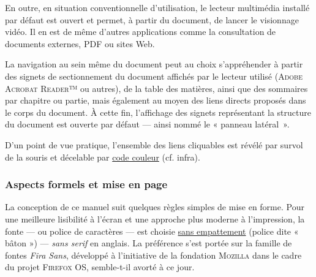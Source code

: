 En outre, en situation conventionnelle d'utilisation, le lecteur multimédia installé par défaut est ouvert et permet, à partir du document, de lancer le visionnage vidéo. Il en est de même d'autres applications comme la consultation de documents externes, PDF ou sites Web.


La navigation au sein même du document peut au choix s'appréhender à partir des signets de sectionnement du document affichés par le lecteur utilisé (\textsc{Adobe Acrobat Reader}™ ou
autres), de la table des matières, 
ainsi que des sommaires par chapitre ou partie, mais également au moyen des liens directs proposés dans le corps du document. À cette fin, l'affichage des signets représentant la structure du document est ouverte par défaut --- ainsi nommé le « panneau latéral~».

D'un point de vue pratique, l'ensemble des liens cliquables est révélé par survol de la souris et décelable par \href{https://fr.wikipedia.org/wiki/Liste_de_noms_de_couleur}{code couleur} (cf. infra).


\subsubsection*{Aspects formels et mise en page}

La conception de ce manuel suit quelques règles simples de mise en forme. Pour une meilleure lisibilité à l'écran et une approche plus moderne à l'impression, la fonte --- ou police de caractères --- est choisie \href{https://fr.wikipedia.org/wiki/Empattement_(typographie)}{sans empattement} (police dite « bâton ») --- \textit{sans serif} en anglais. La préférence s'est portée sur la famille de fontes \textit{Fira Sans}, développé à l'initiative de la fondation \textsc{Mozilla} dans le cadre du projet \textsc{Firefox OS}, semble-t-il avorté à ce jour.

